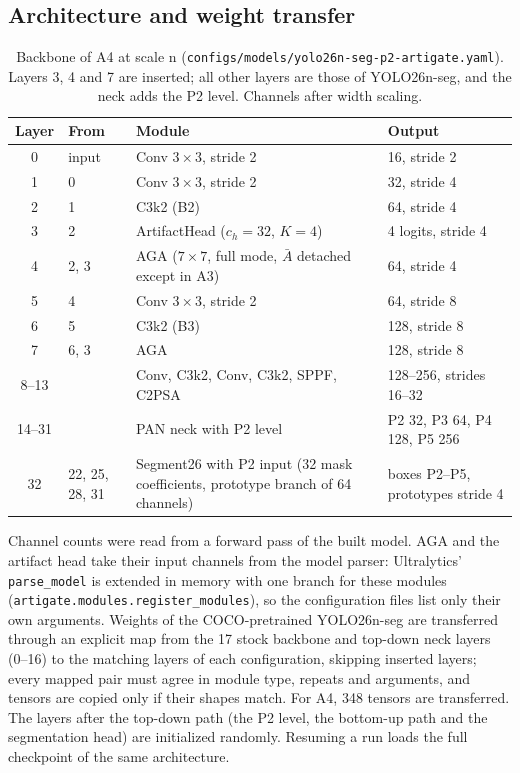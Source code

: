 \documentclass[10pt,a4paper]{article}
\begin{document}
\subsection{Architecture and weight transfer}
\begin{table}[H]
\centering
\caption{Backbone of A4 at scale n (\texttt{configs/models/yolo26n-seg-p2-artigate.yaml}). Layers 3, 4 and 7 are inserted; all other layers are those of YOLO26n-seg, and the neck adds the P2 level. Channels after width scaling.}
\label{tab:s-arch}
\footnotesize
\setlength{\tabcolsep}{4pt}
\begin{tabularx}{\textwidth}{@{}cl>{\raggedright\arraybackslash}Xl@{}}
\toprule
Layer & From & Module & Output \\
\midrule
0 & input & Conv $3\times3$, stride 2 & 16, stride 2 \\
1 & 0 & Conv $3\times3$, stride 2 & 32, stride 4 \\
2 & 1 & C3k2 (B2) & 64, stride 4 \\
3 & 2 & ArtifactHead ($c_h=32$, $K=4$) & 4 logits, stride 4 \\
4 & 2, 3 & AGA ($7\times7$, full mode, $\bar{A}$ detached except in A3) & 64, stride 4 \\
5 & 4 & Conv $3\times3$, stride 2 & 64, stride 8 \\
6 & 5 & C3k2 (B3) & 128, stride 8 \\
7 & 6, 3 & AGA & 128, stride 8 \\
8--13 & & Conv, C3k2, Conv, C3k2, SPPF, C2PSA & 128--256, strides 16--32 \\
14--31 & & PAN neck with P2 level & P2 32, P3 64, P4 128, P5 256 \\
32 & 22, 25, 28, 31 & Segment26 with P2 input (32 mask coefficients, prototype branch of 64 channels) & boxes P2--P5, prototypes stride 4 \\
\bottomrule
\end{tabularx}
\end{table}

\noindent Channel counts were read from a forward pass of the built model. AGA and the artifact head take their input channels from the model parser: Ultralytics' \texttt{parse\_model} is extended in memory with one branch for these modules (\texttt{artigate.modules.register\_modules}), so the configuration files list only their own arguments. Weights of the COCO-pretrained YOLO26n-seg are transferred through an explicit map from the 17 stock backbone and top-down neck layers (0--16) to the matching layers of each configuration, skipping inserted layers; every mapped pair must agree in module type, repeats and arguments, and tensors are copied only if their shapes match. For A4, 348 tensors are transferred. The layers after the top-down path (the P2 level, the bottom-up path and the segmentation head) are initialized randomly. Resuming a run loads the full checkpoint of the same architecture.
\end{document}
